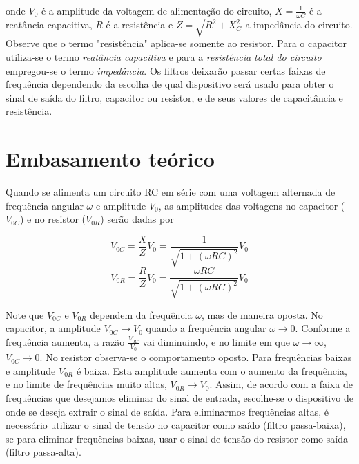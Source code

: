 \documentclass[letterpaper, 12pt]{article}
\begin{document}
onde $V_{0}$ é a amplitude da voltagem de alimentação do circuito, $X=\frac{1}{\omega C}$ é a reatância capacitiva, $R$ é a resistência e $Z=\sqrt{R^{2}+X_{C}^{2}}$ a impedância do circuito. Observe que o termo "resistência" aplica-se somente ao resistor. Para o capacitor utiliza-se o termo \textit{reatância capacitiva} e para a \textit{resistência total do circuito} empregou-se o termo \textit{impedância}. Os filtros deixarão passar certas faixas de frequência dependendo da escolha de qual dispositivo será usado para obter o sinal de saída do filtro, capacitor ou resistor, e de seus valores de capacitância e resistência.



\section{Embasamento teórico}\label{Sec 2 - Teoria}
Quando se alimenta um circuito RC em série com uma voltagem alternada de frequência angular $\omega$ e amplitude $V_{0}$, as amplitudes das voltagens no capacitor ($V_{0C}$) e no resistor ($V_{0R}$) serão dadas por

\begin{equation}\label{V_0C}
    V_{0C}=\frac{X}{Z}V_{0}=\frac{1}{\sqrt{1+(\omega RC)^{2}}}V_{0}
\end{equation}
\begin{equation}\label{V_0R}
    V_{0R}=\frac{R}{Z}V_{0}=\frac{\omega RC}{\sqrt{1+(\omega RC)^{2}}}V_{0}
\end{equation}

Note que $V_{0C}$ e $V_{0R}$ dependem da frequência $\omega$, mas de maneira oposta. No capacitor, a amplitude $V_{0C}\rightarrow V_{0}$ quando a frequência angular $\omega\rightarrow0$. Conforme a frequência aumenta, a razão $\frac{V_{0C}}{V_{0}}$ vai diminuindo, e no limite em que $\omega\rightarrow\infty$, $V_{0C}\rightarrow0$. No resistor observa-se o comportamento oposto. Para frequências baixas e amplitude $V_{0R}$ é baixa. Esta amplitude aumenta com o aumento da frequência, e no limite de frequências muito altas, $V_{0R}\rightarrow V_{0}$. Assim, de acordo com a faixa de frequências que desejamos eliminar do sinal de entrada, escolhe-se o dispositivo de onde se deseja extrair o sinal de saída. Para eliminarmos frequências altas, é necessário utilizar o sinal de tensão no capacitor como saído (filtro passa-baixa), se para eliminar frequências baixas, usar o sinal de tensão do resistor como saída (filtro passa-alta).
\end{document}
